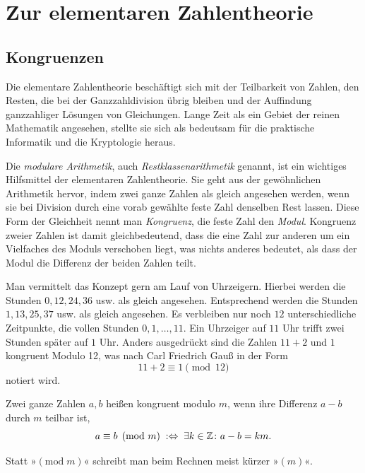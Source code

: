 \newpage
\section{Zur elementaren Zahlentheorie}

\subsection{Kongruenzen}

Die elementare Zahlentheorie beschäftigt sich mit der Teilbarkeit von
Zahlen, den Resten, die bei der Ganzzahldivision übrig bleiben
und der Auffindung ganzzahliger Lösungen von Gleichungen. Lange Zeit
als ein Gebiet der reinen Mathematik angesehen, stellte sie sich
als bedeutsam für die praktische Informatik und die Kryptologie heraus. 

Die \emph{modulare Arithmetik}, auch \emph{Restklassenarithmetik}
genannt, ist ein wichtiges Hilfsmittel der elementaren Zahlentheorie.
Sie geht aus der gewöhnlichen Arithmetik hervor, indem zwei ganze
Zahlen als gleich angesehen werden, wenn sie bei Division durch eine
vorab gewählte feste Zahl denselben Rest lassen. Diese Form der
Gleichheit nennt man \emph{Kongruenz}, die feste Zahl den \emph{Modul}.
Kongruenz zweier Zahlen ist damit gleichbedeutend, dass die eine
Zahl zur anderen um ein Vielfaches des Moduls verschoben liegt, was nichts
anderes bedeutet, als dass der Modul die Differenz der beiden Zahlen teilt.

Man vermittelt das Konzept gern am Lauf von Uhrzeigern. Hierbei werden
die Stunden $0, 12, 24, 36$ usw. als gleich angesehen. Entsprechend
werden die Stunden $1, 13, 25, 37$ usw. als gleich angesehen. Es
verbleiben nur noch $12$ unterschiedliche Zeitpunkte, die vollen
Stunden $0, 1, \ldots, 11$. Ein Uhrzeiger auf $11$ Uhr trifft
zwei Stunden später auf $1$ Uhr. Anders ausgedrückt sind die Zahlen
$11+2$ und $1$ kongruent Modulo 12, was nach Carl Friedrich Gauß
in der Form
\[11 + 2\equiv 1\pmod{12}\]
notiert wird.

\begin{Definition}[Kongruenz]\newlinefirst
Zwei ganze Zahlen $a,b$ heißen kongruent modulo $m$, wenn ihre Differenz
$a-b$ durch $m$ teilbar ist,%
\[a\equiv b\pmod{m}\;:\Leftrightarrow\;\exists k\in\mathbb Z\colon a-b=km.\]
\end{Definition}
Statt »$(\mathrm{mod}\;m)$« schreibt man beim Rechnen meist
kürzer »$(m)$«.

